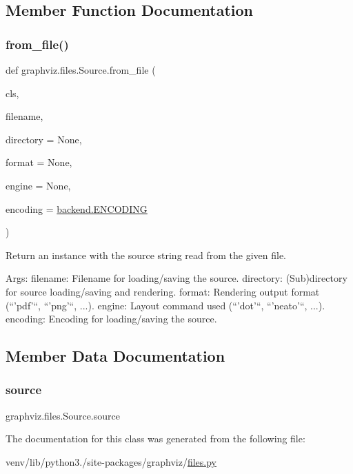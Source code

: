 \subsection{Member Function Documentation}
\mbox{\label{classgraphviz_1_1files_1_1Source_a9ae3935474228749fe76725bced884b5}} 
\subsubsection{\texorpdfstring{from\+\_\+file()}{from\_file()}}
{\footnotesize\ttfamily def graphviz.\+files.\+Source.\+from\+\_\+file (\begin{DoxyParamCaption}\item[{}]{cls,  }\item[{}]{filename,  }\item[{}]{directory = {\ttfamily None},  }\item[{}]{format = {\ttfamily None},  }\item[{}]{engine = {\ttfamily None},  }\item[{}]{encoding = {\ttfamily \hyperlink{namespacegraphviz_1_1backend_aaa5c3555a484c96a0b0e5356ce3a577d}{backend.\+E\+N\+C\+O\+D\+I\+NG}} }\end{DoxyParamCaption})}

\begin{DoxyVerb}Return an instance with the source string read from the given file.

Args:
    filename: Filename for loading/saving the source.
    directory: (Sub)directory for source loading/saving and rendering.
    format: Rendering output format (``'pdf'``, ``'png'``, ...).
    engine: Layout command used (``'dot'``, ``'neato'``, ...).
    encoding: Encoding for loading/saving the source.
\end{DoxyVerb}
 

\subsection{Member Data Documentation}
\mbox{\label{classgraphviz_1_1files_1_1Source_a06d02b8e20f6f3a352576d9e3e917054}} 
\subsubsection{\texorpdfstring{source}{source}}
{\footnotesize\ttfamily graphviz.\+files.\+Source.\+source}



The documentation for this class was generated from the following file\+:\begin{DoxyCompactItemize}
\item 
venv/lib/python3./site-\/packages/graphviz/\hyperlink{files_8py}{files.\+py}\end{DoxyCompactItemize}
